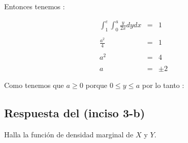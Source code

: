 \documentclass[12pt]{article}
\begin{document}
    \begin{flushleft}
        Entonces tenemos :
    \end{flushleft}
    
    \begin{equation*}
        \begin{array}{rcl}
            \displaystyle \int_{1}^{e}\int_{0}^{a}\frac{y}{2x}dydx & = & 1
            \\
            \\
            \displaystyle \frac{a^2}{4} & = & 1
            \\
            \\
            \displaystyle a^2 & = & 4
            \\
            \\
            \displaystyle a & = &\pm2
        \end{array}
    \end{equation*}


    \begin{flushleft}
        Como tenemos que  $ a\geq0 $ porque $ 0\leq y \leq a $ por lo tanto : 
    \end{flushleft}

    \subsection*{Respuesta del (inciso 3-b)}
    
    \begin{flushleft}
        Halla la funci\'on de densidad marginal de $X$ y $Y$.
    \end{flushleft}
\end{document}
